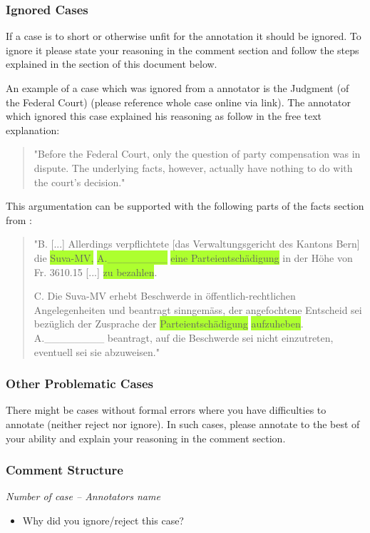 \documentclass{article}
\begin{document}
\subsubsection{Ignored Cases}
If a case is to short or otherwise unfit for the annotation it should be ignored. To ignore it please state your reasoning in the comment section and follow the steps explained in the  section of this document below. 

An example of a case which was ignored from a annotator is the Judgment (of the Federal Court) \citeauthor{8C-641-2019} (please reference whole case online via link). The annotator which ignored this case explained his reasoning as follow in the free text explanation: 
\begin{quote}
"Before the Federal Court, only the question of party compensation was in dispute. The underlying facts, however, actually have nothing to do with the court's decision."
\end{quote}
This argumentation can be supported with the following parts of the facts section from \citeauthor{8C-641-2019}:
\begin{quote}
"B. [...] Allerdings verpflichtete [das Verwaltungsgericht des Kantons Bern] die \colorbox{GreenYellow}{Suva-MV,} \colorbox{GreenYellow}{A.\_\_\_\_\_\_\_\_} \colorbox{GreenYellow}{eine Parteientschädigung} in der Höhe
von Fr. 3610.15 [...]  \colorbox{GreenYellow}{zu bezahlen}.

C. Die Suva-MV erhebt Beschwerde in öffentlich-rechtlichen Angelegenheiten und beantragt sinngemäss, der angefochtene Entscheid sei bezüglich der Zusprache der \colorbox{GreenYellow}{Parteientschädigung} \colorbox{GreenYellow}{aufzuheben}.
A.\_\_\_\_\_\_\_\_ beantragt, auf die Beschwerde sei nicht einzutreten, eventuell sei sie abzuweisen."
\end{quote}
\subsubsection{Other Problematic Cases}
There might be cases without formal errors where you have difficulties to annotate (neither reject nor ignore). In such cases, please annotate to the best of your ability and explain your reasoning in the comment section.
\pagebreak
\subsubsection{Comment Structure}
\begin{mdframed}[frametitle={Comment for rejecting and ignoring case}]
\emph{Number of case – Annotators name}

\begin{itemize}
	\item Why did you ignore/reject this case?
\end{itemize}	
\end{mdframed}
\end{document}
